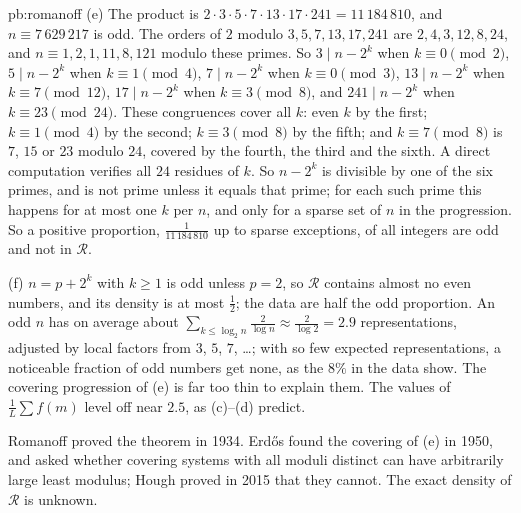 \begin{solution}{pb:romanoff}
(e) The product is $2\cdot3\cdot5\cdot7\cdot13\cdot17\cdot241=11\,184\,810$, and $n\equiv7\,629\,217$ is odd. The orders of $2$ modulo $3,5,7,13,17,241$ are $2,4,3,12,8,24$, and $n\equiv1,2,1,11,8,121$ modulo these primes. So $3\mid n-2^k$ when $k\equiv0\pmod2$,
$5\mid n-2^k$ when $k\equiv1\pmod4$, $7\mid n-2^k$ when $k\equiv0\pmod3$, $13\mid n-2^k$ when $k\equiv7\pmod{12}$, $17\mid n-2^k$ when $k\equiv3\pmod8$, and $241\mid n-2^k$ when
$k\equiv23\pmod{24}$. These congruences cover all $k$: even $k$ by the first; $k\equiv1\pmod4$ by the second; $k\equiv3\pmod8$ by the fifth; and $k\equiv7\pmod8$ is $7$, $15$ or $23$ modulo
$24$, covered by the fourth, the third and the sixth. A direct computation verifies all $24$ residues of $k$. So $n-2^k$ is
divisible by one of the six primes, and is not prime unless it equals that prime; for each such prime this happens for at most one $k$ per $n$, and only for a sparse set of $n$
in the progression. So a positive proportion, $\frac1{11\,184\,810}$ up to sparse exceptions, of all integers are odd and not in $\mathcal R$.

(f) $n=p+2^k$ with $k\ge1$ is odd unless $p=2$, so $\mathcal R$ contains almost no even numbers, and its density is at most $\frac12$; the data are half the odd proportion. An odd $n$
has on average about $\sum_{k\le\log_2n}\frac{2}{\log n}\approx\frac2{\log2}=2.9$ representations, adjusted by local factors from $3$, $5$, $7$, \dots; with so few expected
representations, a noticeable fraction of odd numbers get none, as the $8\%$ in the data show. The covering progression of (e) is far too thin to explain them. The values of
$\frac1L\sum f(m)$ level off near $2.5$, as (c)--(d) predict.


\leads Romanoff proved the theorem in 1934. Erd\H os found the covering of (e) in 1950, and asked whether covering systems with all moduli distinct can have arbitrarily large
least modulus; Hough proved in 2015 that they cannot. The exact density of $\mathcal R$ is unknown.
\end{solution}

